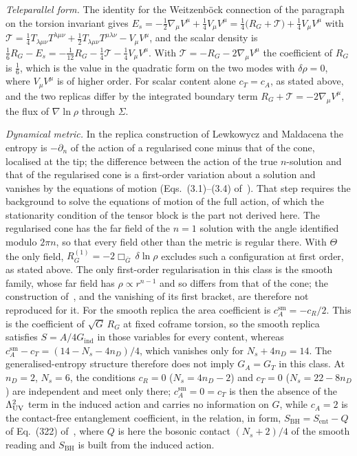 \emph{Teleparallel form.} The identity for the Weitzenb\"ock connection of the paragraph on the torsion invariant gives \(E_s=-\tfrac12\nabla_\mu V^\mu+\tfrac14V_\mu V^\mu=\tfrac14\bigl(R_G+\mathcal T\bigr)+\tfrac14V_\mu V^\mu\) with \(\mathcal T=\tfrac14T_{\lambda\mu\nu}T^{\lambda\mu\nu}+\tfrac12T_{\lambda\mu\nu}T^{\mu\lambda\nu}-V_\mu V^\mu\), and the scalar density is \(\tfrac16R_G-E_s=-\tfrac1{12}R_G-\tfrac14\mathcal T-\tfrac14V_\mu V^\mu\). With \(\mathcal T=-R_G-2\nabla_\mu V^\mu\) the coefficient of \(R_G\) is \(\tfrac16\), which is the value in the quadratic form on the two modes with \(\delta\rho=0\), where \(V_\mu V^\mu\) is of higher order. For scalar content alone \(c_T=c_A\), as stated above, and the two replicas differ by the integrated boundary term \(R_G+\mathcal T=-2\nabla_\mu V^\mu\), the flux of \(\nabla\ln\rho\) through \(\Sigma\).

\emph{Dynamical metric.} In the replica construction of Lewkowycz and Maldacena the entropy is \(-\partial_n\) of the action of a regularised cone minus that of the cone, localised at the tip; the difference between the action of the true \(n\)-solution and that of the regularised cone is a first-order variation about a solution and vanishes by the equations of motion (Eqs.~(3.1)--(3.4) of~\cite{LewkowyczMaldacena2013}). That step requires the background to solve the equations of motion of the full action, of which the stationarity condition of the tensor block is the part not derived here. The regularised cone has the far field of the \(n=1\) solution with the angle identified modulo \(2\pi n\), so that every field other than the metric is regular there. With \(\Theta\) the only field, \(R_G^{(1)}=-2\Box_{\bar G}\,\delta\ln\rho\) excludes such a configuration at first order, as stated above. The only first-order regularisation in this class is the smooth family, whose far field has \(\rho\propto r^{n-1}\) and so differs from that of the cone; the construction of~\cite{LewkowyczMaldacena2013}, and the vanishing of its first bracket, are therefore not reproduced for it. For the smooth replica the area coefficient is \(c_A^{\mathrm{sm}}=-c_R/2\). This is the coefficient of \(\sqrt G\,R_G\) at fixed coframe torsion, so the smooth replica satisfies \(S=A/4G_{\mathrm{ind}}\) in those variables for every content, whereas \(c_A^{\mathrm{sm}}-c_T=(14-N_s-4n_D)/4\), which vanishes only for \(N_s+4n_D=14\). The generalised-entropy structure therefore does not imply \(G_A=G_T\) in this class. At \(n_D=2\), \(N_s=6\), the conditions \(c_R=0\) (\(N_s=4n_D-2\)) and \(c_T=0\) (\(N_s=22-8n_D\)) are independent and meet only there; \(c_A^{\mathrm{sm}}=0=c_T\) is then the absence of the \(\Lambda_{\mathrm{UV}}^2\) term in the induced action and carries no information on \(G\), while \(c_A=2\) is the contact-free entanglement coefficient, in the relation, in form, \(S_{\mathrm{BH}}=S_{\mathrm{ent}}-Q\) of Eq.~(322) of~\cite{Solodukhin2011}, where \(Q\) is here the bosonic contact \((N_s+2)/4\) of the smooth reading and \(S_{\mathrm{BH}}\) is built from the induced action.

